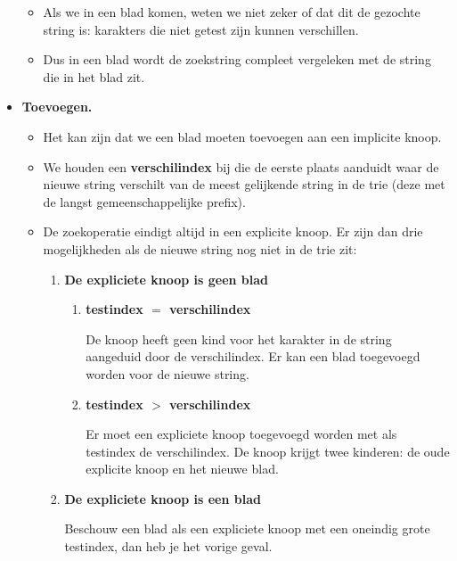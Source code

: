 \begin{itemize}
\begin{itemize}
        \item Als we in een blad komen, weten we niet zeker of dat dit de gezochte string is: karakters die niet getest zijn kunnen verschillen.
        \item Dus in een blad wordt de zoekstring compleet vergeleken met de string die in het blad zit.
    \end{itemize}
    \item \textbf{Toevoegen.}
    \begin{itemize}
        \item Het kan zijn dat we een blad moeten toevoegen aan een implicite knoop.
        \item We houden een \textbf{verschilindex} bij die de eerste plaats aanduidt waar de nieuwe string verschilt van de meest gelijkende string in de trie (deze met de langst gemeenschappelijke prefix).
        \item De zoekoperatie eindigt altijd in een explicite knoop. Er zijn dan drie mogelijkheden als de nieuwe string nog niet in de trie zit:
        \begin{enumerate}
            \item \textbf{De expliciete knoop is geen blad}
            \begin{enumerate}
                \item \textbf{testindex $=$ verschilindex}
                                                                           
                De knoop heeft geen kind voor het karakter in de string aangeduid door de verschilindex. Er kan een blad toegevoegd worden voor de nieuwe string.
                \item \textbf{testindex $>$ verschilindex}
    
                Er moet een expliciete knoop toegevoegd worden met als testindex de verschilindex. De knoop krijgt twee kinderen: de oude explicite knoop en het nieuwe blad. 
            \end{enumerate}

            \item  \textbf{De expliciete knoop is een blad}
            
            Beschouw een blad als een expliciete knoop met een oneindig grote testindex, dan heb je het vorige geval.
        \end{enumerate}
    \end{itemize}

\end{itemize}

